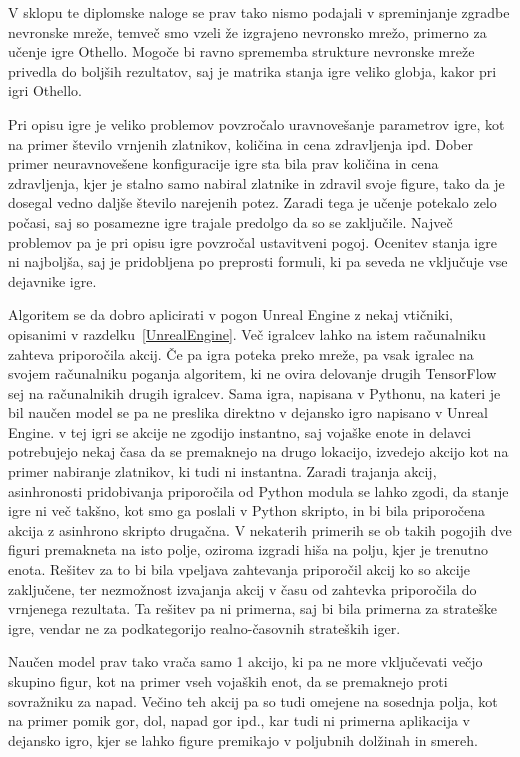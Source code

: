 \documentclass[a4paper, 12pt]{book}
\begin{document}
V sklopu te diplomske naloge se prav tako nismo podajali v spreminjanje zgradbe nevronske mreže, temveč smo vzeli že izgrajeno nevronsko mrežo, primerno za učenje igre Othello.
Mogoče bi ravno sprememba strukture nevronske mreže privedla do boljših rezultatov, saj je matrika stanja igre veliko globja, kakor pri igri Othello.

Pri opisu igre je veliko problemov povzročalo uravnovešanje parametrov igre, kot na primer število vrnjenih zlatnikov, količina in cena zdravljenja ipd.
Dober primer neuravnovešene konfiguracije igre sta bila prav količina in cena zdravljenja, kjer je stalno samo nabiral zlatnike in zdravil svoje figure, tako da je dosegal vedno daljše število narejenih potez.
Zaradi tega je učenje potekalo zelo počasi, saj so posamezne igre trajale predolgo da so se zaključile.
Največ problemov pa je pri opisu igre povzročal ustavitveni pogoj.
Ocenitev stanja igre ni najboljša, saj je pridobljena po preprosti formuli, ki pa seveda ne vključuje vse dejavnike igre.



Algoritem se da dobro aplicirati v pogon Unreal Engine z nekaj vtičniki, opisanimi v razdelku~\ref{UnrealEngine}. Več igralcev lahko na istem računalniku zahteva priporočila akcij. 
Če pa igra poteka preko mreže, pa vsak igralec na svojem računalniku poganja algoritem, ki ne ovira delovanje drugih TensorFlow sej na računalnikih drugih igralcev.
Sama igra, napisana v Pythonu, na kateri je bil naučen model se pa ne preslika direktno v dejansko igro napisano v Unreal Engine.
v tej igri se akcije ne zgodijo instantno, saj vojaške enote in delavci potrebujejo nekaj časa da se premaknejo na drugo lokacijo, izvedejo akcijo kot na primer nabiranje zlatnikov, ki tudi ni instantna.
Zaradi trajanja akcij, asinhronosti pridobivanja priporočila od Python modula se lahko zgodi, da stanje igre ni več takšno, kot smo ga poslali v Python skripto, in bi bila priporočena akcija z asinhrono skripto drugačna. 
V nekaterih primerih se ob takih pogojih dve figuri premakneta na isto polje, oziroma izgradi hiša na polju, kjer je trenutno enota. 
Rešitev za to bi bila vpeljava zahtevanja priporočil akcij ko so akcije zaključene, ter nezmožnost izvajanja akcij v času od zahtevka priporočila do vrnjenega rezultata.
Ta rešitev pa ni primerna, saj bi bila primerna za strateške igre, vendar ne za podkategorijo realno-časovnih strateških iger.

Naučen model prav tako vrača samo 1 akcijo, ki pa ne more vključevati večjo skupino figur, kot na primer vseh vojaških enot, da se premaknejo proti sovražniku za napad.
Večino teh akcij pa so tudi omejene na sosednja polja, kot na primer pomik gor, dol, napad gor ipd., kar tudi ni primerna aplikacija v dejansko igro, kjer se lahko figure premikajo v poljubnih dolžinah in smereh.
\end{document}
